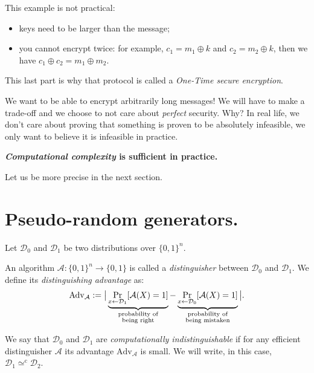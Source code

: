 \documentclass[./main]{subfiles}
\begin{document}
  \begin{rmk}
    This example is not practical:
    \begin{itemize}
      \item keys need to be larger than the message;
      \item you cannot encrypt twice: for example, $c_1 = m_1 \oplus k$ and $c_2 = m_2 \oplus k$, then we have $c_1 \oplus c_2 = m_1 \oplus m_2$.
    \end{itemize}
    This last part is why that protocol is called a \textit{One-Time secure encryption}.
  \end{rmk}

  We want to be able to encrypt arbitrarily long messages!
  We will have to make a trade-off and we choose to not care about \textit{perfect} security.
  Why? In real life, we don't care about proving that something is proven to be absolutely infeasible, we only want to believe it is infeasible in practice.
  \begin{center}
  \textbf{\textit{Computational complexity} is sufficient in practice.}
  \end{center}
  Let us be more precise in the next section.

  \section{Pseudo-random generators.}

  \begin{defn}
    Let $\mathcal{D}_0$ and $\mathcal{D}_1$ be two distributions over $\{0,1\}^n$.

    An algorithm $\mathcal{A} : \{0,1\}^n \to \{0,1\}$ is called a \textit{distinguisher} between $\mathcal{D}_0$ and $\mathcal{D}_1$. We define its \textit{distinguishing advantage} as:
    \[
      \mathrm{Adv}_\mathcal{A} := \big| \underbrace{\Pr_{x \gets \mathcal{D}_1} [\mathcal{A}(X) = 1]}_{ \mathclap{\substack{\text{probability of}\\ \text{being right}}} } - \underbrace{\Pr_{x \gets \mathcal{D}_0} [\mathcal{A}(X) = 1]}_{\mathclap{\substack{\text{probability of}\\ \text{being mistaken}}}} \big|
    .\] 

    We say that $\mathcal{D}_0$ and $\mathcal{D}_1$ are \textit{computationally indistinguishable} if for any efficient distinguisher $\mathcal{A}$ its advantage $\mathrm{Adv}_\mathcal{A}$ is small.
    We will write, in this case, $\mathcal{D}_1 \simeq^\mathrm{c} \mathcal{D}_2$.
  \end{defn}
\end{document}
